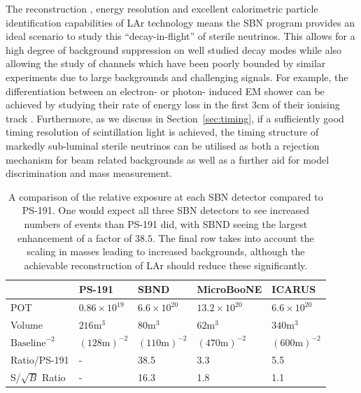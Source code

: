 \documentclass[11pt, a4paper]{article}
\newcommand{\refsec}[1]{Section~\ref{#1}}
\begin{document}
The reconstruction \cite{Church:2013hea, Marshall:2015rfa}, energy resolution
\cite{Sorel:2014rka} and excellent calorimetric particle identification
capabilities of LAr \cite{Antonello:2012hu} technology means the SBN program
provides an ideal scenario to study this ``decay-in-flight'' of sterile
neutrinos.  This allows for a high degree of background suppression on well
studied decay modes while also allowing the study of channels which have been
poorly bounded by similar experiments due to large backgrounds and challenging
signals. For example, the differentiation between an electron- or photon-
induced EM shower can be achieved by studying their rate of energy loss in the
first 3cm of their ionising track \cite{szelc:2007}. Furthermore, as we
discuss in \refsec{sec:timing}, if a sufficiently good timing resolution of
scintillation light is achieved, the timing structure of markedly sub-luminal
sterile neutrinos can be utilised as both a rejection mechanism for beam
related backgrounds as well as a further aid for model discrimination and mass
measurement.

\begin{table}[t!]
\centering
\begin{tabular}{| l || l | l | l | l |}
	\hline
	& PS-191 & SBND & MicroBooNE & ICARUS \\ \hline \hline
	POT	& $0.86 \times 10^{19}$	& $6.6 \times 10^{20}$	&	$13.2 \times 10^{20}$     &  $6.6 \times 10^{20}$ \\ \hline
	Volume	& $216\text{m}^3$	&	$80\text{m}^3$	&	$62\text{m}^3$	     &   $340\text{m}^3$	\\ \hline
	$\text{Baseline}^{-2}$	& $(128 	\text{m} )^{-2}$	&$(110 \text{m} )^{-2}$	&	$(470 \text{m} )^{-2}$			     & $(600 \text{m} )^{-2}$	  \\ \hline
Ratio/PS-191 & - 	& 38.5 	& 3.3	& 5.5\\ \hline
	S/$\sqrt{B}$ Ratio & - 	& 16.3 	& 1.8	& 1.1\\ \hline
\end{tabular}

\caption{\label{tab:exposure} A comparison of the relative exposure at each SBN detector
compared to PS-191. One would expect all  three SBN detectors to see increased
numbers of events than PS-191 did, with SBND seeing the largest enhancement of a
factor of $38.5$. The final row takes into account the scaling in masses
leading to increased backgrounds, although the achievable reconstruction of LAr
should reduce these significantly.}

\end{table}
\end{document}

